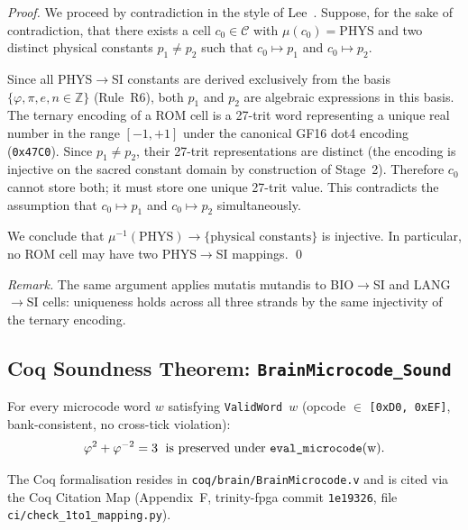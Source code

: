 \begin{proof}
  We proceed by contradiction in the style of Lee~\cite{lee_gvsu_style}.
  Suppose, for the sake of contradiction, that there exists a cell
  $c_0 \in \mathcal{C}$ with $\mu(c_0) = \mathrm{PHYS}$ and two distinct
  physical constants $p_1 \neq p_2$ such that $c_0 \mapsto p_1$ and
  $c_0 \mapsto p_2$.

  Since all PHYS$\to$SI constants are derived exclusively from the basis
  $\{\varphi, \pi, e, n \in \mathbb{Z}\}$ (Rule~R6), both $p_1$ and $p_2$
  are algebraic expressions in this basis.  The ternary encoding of a ROM cell
  is a 27-trit word representing a unique real number in the range
  $[-1,+1]$ under the canonical GF16 dot4 encoding (\texttt{0x47C0}).  Since
  $p_1 \neq p_2$, their 27-trit representations are distinct (the encoding
  is injective on the sacred constant domain by construction of Stage~2).
  Therefore $c_0$ cannot store both; it must store one unique 27-trit value.
  This contradicts the assumption that $c_0 \mapsto p_1$ and $c_0 \mapsto p_2$
  simultaneously.

  We conclude that $\mu^{-1}(\mathrm{PHYS}) \to \{\text{physical constants}\}$
  is injective.  In particular, no ROM cell may have two PHYS$\to$SI mappings.
  \qed
\end{proof}

\noindent\textit{Remark.} The same argument applies mutatis mutandis to
BIO$\to$SI and LANG$\to$SI cells: uniqueness holds across all three strands
by the same injectivity of the ternary encoding.


\subsection{Coq Soundness Theorem: \texttt{BrainMicrocode\_Sound}}
\label{ssec:flos73-coq}

\begin{theorem}
  \label{thm:flos73-coq-sound}
  For every microcode word $w$ satisfying \textup{\texttt{ValidWord}~$w$}
  (opcode $\in$ \texttt{[0xD0, 0xEF]}, bank-consistent, no cross-tick
  violation):
  \[
    \varphi^{2}+\varphi^{-2}=3 \;\text{ is preserved under }\textup{\texttt{eval\_microcode}(w).}
  \]
\end{theorem}

The Coq formalisation resides in \texttt{coq/brain/BrainMicrocode.v} and is
cited via the Coq Citation Map (Appendix~F, trinity-fpga commit
\texttt{1e19326}, file \texttt{ci/check\_1to1\_mapping.py}).

